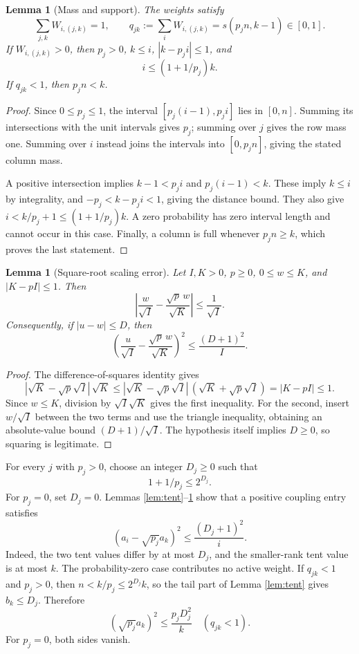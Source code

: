 \documentclass[11pt]{article}
\newtheorem{lemma}[theorem]{Lemma}
\begin{document}
\begin{lemma}[Mass and support]\label{lem:coupling}
The weights satisfy
\[
 \sum_{j,k}W_{i,(j,k)}=1,
 \qquad q_{jk}:=\sum_iW_{i,(j,k)}=s(p_jn,k-1)\in[0,1].
\]
If $W_{i,(j,k)}>0$, then $p_j>0$, $k\leq i$, $|k-p_ji|\leq1$, and
\[
 i\leq(1+1/p_j)k.
\]
If $q_{jk}<1$, then $p_jn<k$.
\end{lemma}
\begin{proof}
Since $0\leq p_j\leq1$, the interval $[p_j(i-1),p_ji]$ lies in $[0,n]$. Summing its intersections with the unit intervals gives $p_j$; summing over $j$ gives the row mass one. Summing over $i$ instead joins the intervals into $[0,p_jn]$, giving the stated column mass.

A positive intersection implies $k-1<p_ji$ and $p_j(i-1)<k$. These imply $k\leq i$ by integrality, and $-p_j<k-p_ji<1$, giving the distance bound. They also give $i<k/p_j+1\leq(1+1/p_j)k$. A zero probability has zero interval length and cannot occur in this case. Finally, a column is full whenever $p_jn\geq k$, which proves the last statement.
\end{proof}

\begin{lemma}[Square-root scaling error]\label{lem:scalar}
Let $I,K>0$, $p\geq0$, $0\leq w\leq K$, and $|K-pI|\leq1$. Then
\[
 \left|\frac{w}{\sqrt I}-\frac{\sqrt p\,w}{\sqrt K}\right|
 \leq\frac1{\sqrt I}.
\]
Consequently, if $|u-w|\leq D$, then
\begin{equation}
 \left(\frac{u}{\sqrt I}-\frac{\sqrt p\,w}{\sqrt K}\right)^2
 \leq\frac{(D+1)^2}{I}.
 \label{eq:scalar}
\end{equation}
\end{lemma}
\begin{proof}
The difference-of-squares identity gives
\[
 |\sqrt K-\sqrt p\sqrt I|\,\sqrt K
 \leq |\sqrt K-\sqrt p\sqrt I|\,(\sqrt K+\sqrt p\sqrt I)
 =|K-pI|\leq1.
\]
Since $w\leq K$, division by $\sqrt I\sqrt K$ gives the first inequality. For the second, insert $w/\sqrt I$ between the two terms and use the triangle inequality, obtaining an absolute-value bound $(D+1)/\sqrt I$. The hypothesis itself implies $D\geq0$, so squaring is legitimate.
\end{proof}

For every $j$ with $p_j>0$, choose an integer $D_j\geq0$ such that
\begin{equation}
 1+1/p_j\leq2^{D_j}.\label{eq:shift}
\end{equation}
For $p_j=0$, set $D_j=0$. Lemmas \ref{lem:tent}--\ref{lem:scalar} show that a positive coupling entry satisfies
\begin{equation}
 (a_i-\sqrt{p_j}a_k)^2\leq\frac{(D_j+1)^2}{i}.\label{eq:active}
\end{equation}
Indeed, the two tent values differ by at most $D_j$, and the smaller-rank tent value is at most $k$. The probability-zero case contributes no active weight. If $q_{jk}<1$ and $p_j>0$, then $n<k/p_j\leq2^{D_j}k$, so the tail part of Lemma \ref{lem:tent} gives $b_k\leq D_j$. Therefore
\begin{equation}
 (\sqrt{p_j}a_k)^2\leq\frac{p_jD_j^2}{k}\quad(q_{jk}<1).\label{eq:tail}
\end{equation}
For $p_j=0$, both sides vanish.
\end{document}
